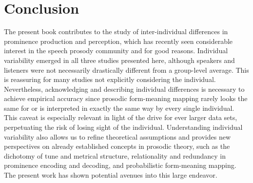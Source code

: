 \section{Conclusion} \label{sec: conclusions}

The present book contributes to the study of inter-individual differences in prominence production and perception, which has recently seen considerable interest in the speech prosody community \textendash{} and for good reasons. Individual variability emerged in all three studies presented here, although speakers and listeners were not necessarily drastically different from a group-level average. This is reassuring for many studies not explicitly considering the individual. Nevertheless, acknowledging and describing individual differences is necessary to achieve empirical accuracy since prosodic form-meaning mapping rarely looks the same for or is interpreted in exactly the same way by every single individual. This caveat is especially relevant in light of the drive for ever larger data sets, perpetuating the risk of losing sight of the individual. Understanding individual variability also allows us to refine theoretical assumptions and provides new perspectives on already established concepts in prosodic theory, such as the dichotomy of tune and metrical structure, relationality and redundancy in prominence encoding and decoding, and probabilistic form-meaning mapping. The present work has shown potential avenues into this large endeavor. 